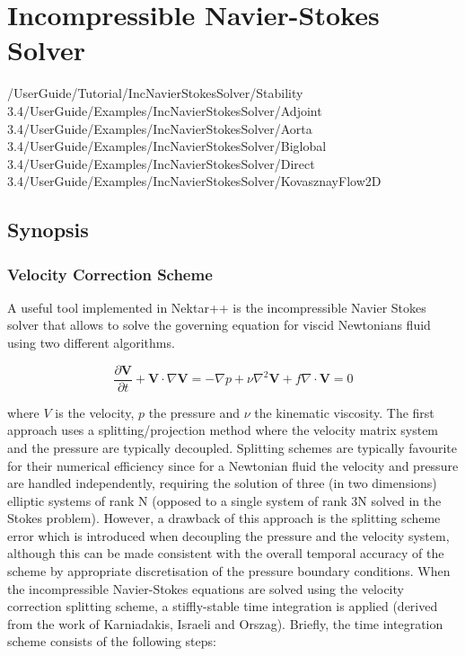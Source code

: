 \chapter{Incompressible Navier-Stokes Solver}
\label{IncNSsolver}

/UserGuide/Tutorial/IncNavierStokesSolver/Stability
3.4/UserGuide/Examples/IncNavierStokesSolver/Adjoint
3.4/UserGuide/Examples/IncNavierStokesSolver/Aorta
3.4/UserGuide/Examples/IncNavierStokesSolver/Biglobal
3.4/UserGuide/Examples/IncNavierStokesSolver/Direct
3.4/UserGuide/Examples/IncNavierStokesSolver/KovasznayFlow2D

\section{Synopsis}
\subsection{Velocity Correction Scheme}
\label{VCSscheme}
A useful tool implemented in Nektar++ is the incompressible Navier Stokes solver that allows to solve the governing equation for viscid Newtonians fluid using two different algorithms. 

\begin{subequations}
\begin{equation}
   \frac{\partial \mathbf{V}}{\partial t} + \mathbf{V} \cdot \nabla \mathbf{V} = -\nabla p + \nu \nabla^2 \mathbf{V} + f
 \end{equation}
 
 \begin{equation}
    \nabla \cdot \mathbf{V} = 0
    \end{equation}
 \end{subequations}
 
where $V$ is the velocity, $p$ the pressure and $\nu$ the kinematic viscosity. The first approach uses a splitting/projection method where the velocity matrix system and the pressure are typically decoupled. Splitting schemes are typically favourite for their numerical efficiency since for a Newtonian fluid the velocity and pressure are handled independently, requiring the solution of three (in two dimensions) elliptic systems of rank N (opposed to a single system of rank 3N solved in the Stokes problem). However, a drawback of this approach is the splitting scheme error which is introduced when decoupling the pressure and the velocity system, although this can be made consistent with the overall temporal accuracy of the scheme by appropriate discretisation of the pressure boundary conditions. When the incompressible Navier-Stokes equations are solved using the velocity correction splitting scheme, a stiffly-stable time integration is applied (derived from the work of Karniadakis, Israeli and Orszag).
 Briefly, the time integration scheme consists of the following steps:\\
 
